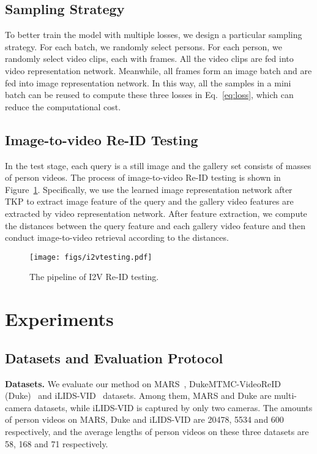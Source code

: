 \documentclass[10pt,twocolumn,letterpaper]{article}
\begin{document}
\subsection{Sampling Strategy}
\label{sec:sampling}
To better train the model with multiple losses, we design a particular sampling strategy.
For each batch, we randomly select  persons.
For each person, we randomly select  video clips, each with  frames.
All the  video clips are fed into video representation network.
Meanwhile, all  frames form an image batch and are fed into image representation network.
In this way, all the samples in a mini batch can be reused to compute these three losses in Eq.~\eqref{eq:loss}, which can reduce the computational cost.


\subsection{Image-to-video Re-ID Testing}
\label{sec:i2vtesting}
In the test stage, each query is a still image and the gallery set consists of masses of person videos.
The process of image-to-video Re-ID testing is shown in Figure~\ref{fig:I2Vtesting}.
Specifically, we use the learned image representation network after TKP to extract image feature of the query and the gallery video features are extracted by video representation network.
After feature extraction, we compute the distances between the query feature and each gallery video feature and then conduct image-to-video retrieval according to the distances.

\begin{figure}[t]
	\begin{center}
		\texttt{[image: figs/i2vtesting.pdf]}
	\end{center}
	\vspace{-20pt}
	\caption{The pipeline of I2V Re-ID testing.}
	\vspace{-20pt}
	\label{fig:I2Vtesting}
\end{figure}

\section{Experiments}

\subsection{Datasets and Evaluation Protocol}

\noindent
{\bf Datasets.}
We evaluate our method on MARS~\cite{Zheng2016MARS}, DukeMTMC-VideoReID (Duke)~\cite{Wu2018One} and iLIDS-VID~\cite{Wang2014Person} datasets.
Among them, MARS and Duke are multi-camera datasets, while iLIDS-VID is captured by only two cameras.
The amounts of person videos on MARS, Duke and iLIDS-VID are 20478, 5534 and 600 respectively, and the average lengths of person videos on these three datasets are 58, 168 and 71 respectively.
\end{document}
